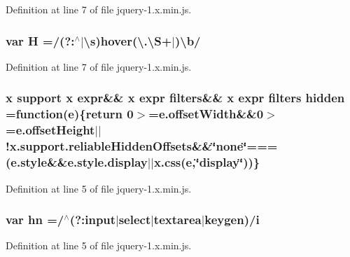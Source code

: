 Definition at line 7 of file jquery-\/1.\+x.\+min.\+js.

\subsubsection[{\texorpdfstring{H}{H}}]{\setlength{\rightskip}{0pt plus 5cm}var H =/(?\+:$^\wedge$$\vert$\textbackslash{}{\bf s})hover(\textbackslash{}.\textbackslash{}{\bf S}+$\vert$)\textbackslash{}{\bf b}/}\hypertarget{jquery-1_8x_8min_8js_abd057520df7a5dc64fe29b4edd3166a3}{}\label{jquery-1_8x_8min_8js_abd057520df7a5dc64fe29b4edd3166a3}


Definition at line 7 of file jquery-\/1.\+x.\+min.\+js.

\subsubsection[{\texorpdfstring{hidden}{hidden}}]{ {\bf x} support {\bf x} expr\&\& {\bf x} expr {\bf filters}\&\& {\bf x} expr {\bf filters} hidden =function({\bf e})\{return 0$>$=e.\+offset\+Width\&\&0$>$=e.\+offset\+Height$\vert$$\vert$!x.\+support.\+reliable\+Hidden\+Offsets\&\&\char`\"{}none\char`\"{}===(e.\+style\&\&e.\+style.\+display$\vert$$\vert${\bf x.\+css}({\bf e},\char`\"{}display\char`\"{}))\}}\hypertarget{jquery-1_8x_8min_8js_a086b6295ec8d15f090cd7239137a4979}{}\label{jquery-1_8x_8min_8js_a086b6295ec8d15f090cd7239137a4979}


Definition at line 5 of file jquery-\/1.\+x.\+min.\+js.

\subsubsection[{\texorpdfstring{hn}{hn}}]{\setlength{\rightskip}{0pt plus 5cm}var hn =/$^\wedge$(?\+:input$\vert$select$\vert$textarea$\vert$keygen)/{\bf i}}\hypertarget{jquery-1_8x_8min_8js_a703d7f6a2aadb540eb051a5f62674194}{}\label{jquery-1_8x_8min_8js_a703d7f6a2aadb540eb051a5f62674194}


Definition at line 5 of file jquery-\/1.\+x.\+min.\+js.

